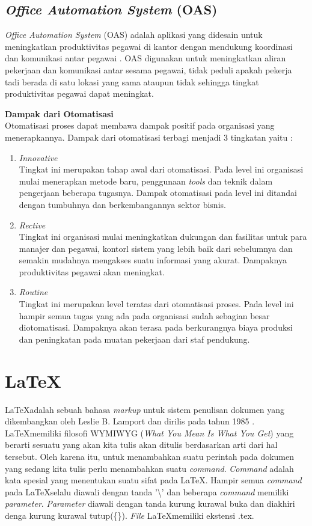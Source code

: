 \subsection{\textit{Office Automation System} (OAS)}
\label{sec:oas}
\textit{Office Automation System} (OAS) adalah aplikasi yang didesain untuk meningkatkan produktivitas pegawai di kantor dengan mendukung koordinasi dan komunikasi antar pegawai \cite{Susan:1982}. OAS digunakan untuk meningkatkan aliran pekerjaan dan komunikasi antar sesama pegawai, tidak peduli apakah pekerja tadi berada di satu lokasi yang sama ataupun tidak sehingga tingkat produktivitas pegawai dapat meningkat.

\textbf{Dampak dari Otomatisasi}\\
Otomatisasi proses dapat membawa dampak positif pada organisasi yang menerapkannya. Dampak dari otomatisasi terbagi menjadi 3 tingkatan yaitu \cite{Susan:1982}: 
\begin{enumerate}
	\item \textit{Innovative}\\
	Tingkat ini merupakan tahap awal dari otomatisasi. Pada level ini organisasi mulai menerapkan metode baru, penggunaan \textit{tools} dan teknik dalam pengerjaan beberapa tugasnya. Dampak otomatisasi pada level ini ditandai dengan tumbuhnya dan berkembangannya sektor bisnis.
	\item \textit{Rective}\\
	Tingkat ini organisasi mulai meningkatkan dukungan dan fasilitas untuk para manajer dan pegawai, kontorl sistem yang lebih baik dari sebelumnya dan semakin mudahnya mengakses suatu informasi yang akurat. Dampaknya produktivitas pegawai akan meningkat.
	\item \textit{Routine}\\
	Tingkat ini merupakan level teratas dari otomatisasi proses. Pada level ini hampir semua tugas yang ada pada organisasi sudah sebagian besar diotomatisasi. Dampaknya akan terasa pada berkurangnya biaya produksi dan peningkatan pada muatan pekerjaan dari staf pendukung.
\end{enumerate}
 
\section{\LaTeX}
\label{sec:latex}
\LaTeX adalah sebuah bahasa \textit{markup} untuk sistem penulisan dokumen yang dikembangkan oleh Leslie B. Lamport dan dirilis pada tahun 1985 \cite{Lamport:1994}. \LaTeX memiliki filosofi WYMIWYG (\textit{What You Mean Is What You Get}) yang berarti sesuatu yang akan kita tulis akan ditulis berdasarkan arti dari hal tersebut. Oleh karena itu, untuk menambahkan suatu perintah pada dokumen yang sedang kita tulis perlu menambahkan suatu \textit{command}. \textit{Command} adalah kata spesial yang menentukan suatu sifat pada \LaTeX. Hampir semua \textit{command} pada \LaTeX selalu diawali dengan tanda '\textbackslash' dan beberapa \textit{command} memiliki \textit{parameter}. \textit{Parameter} diawali dengan tanda kurung kurawal buka dan diakhiri denga kurung kurawal tutup(\{\}). \textit{File} \LaTeX memiliki ekstensi .tex.  

